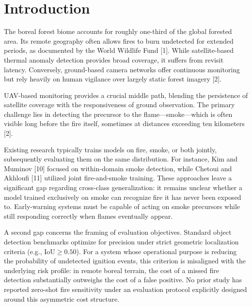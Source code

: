 \documentclass[conference]{IEEEtran}
\begin{document}
\section{Introduction}
The boreal forest biome accounts for roughly one-third of the global forested area. Its remote geography often allows fires to burn undetected for extended periods, as documented by the World Wildlife Fund [1]. While satellite-based thermal anomaly detection provides broad coverage, it suffers from revisit latency. Conversely, ground-based camera networks offer continuous monitoring but rely heavily on human vigilance over largely static forest imagery [2].

UAV-based monitoring provides a crucial middle path, blending the persistence of satellite coverage with the responsiveness of ground observation. The primary challenge lies in detecting the precursor to the flame---smoke---which is often visible long before the fire itself, sometimes at distances exceeding ten kilometers [2].

Existing research typically trains models on fire, smoke, or both jointly, subsequently evaluating them on the same distribution. For instance, Kim and Muminov [10] focused on within-domain smoke detection, while Chetoui and Akhloufi [11] utilized joint fire-and-smoke training. These approaches leave a significant gap regarding cross-class generalization: it remains unclear whether a model trained exclusively on smoke can recognize fire it has never been exposed to. Early-warning systems must be capable of acting on smoke precursors while still responding correctly when flames eventually appear.

A second gap concerns the framing of evaluation objectives. Standard object detection benchmarks optimize for precision under strict geometric localization criteria (e.g., $\text{IoU} \ge 0.50$). For a system whose operational purpose is reducing the probability of undetected ignition events, this criterion is misaligned with the underlying risk profile: in remote boreal terrain, the cost of a missed fire detection substantially outweighs the cost of a false positive. No prior study has reported zero-shot fire sensitivity under an evaluation protocol explicitly designed around this asymmetric cost structure.
\end{document}
